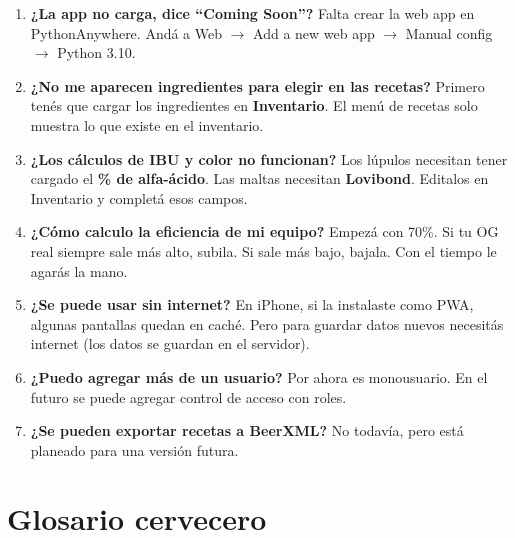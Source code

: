 \documentclass[11pt,a4paper]{report}
\begin{document}
\begin{enumerate}[leftmargin=*, itemsep=8pt]

\item \textbf{¿La app no carga, dice ``Coming Soon''?}
Falta crear la web app en PythonAnywhere. Andá a Web $\to$ Add a new web app $\to$ Manual config $\to$ Python 3.10.

\item \textbf{¿No me aparecen ingredientes para elegir en las recetas?}
Primero tenés que cargar los ingredientes en \textbf{Inventario}. El menú de recetas solo muestra lo que existe en el inventario.

\item \textbf{¿Los cálculos de IBU y color no funcionan?}
Los lúpulos necesitan tener cargado el \textbf{\% de alfa-ácido}. Las maltas necesitan \textbf{Lovibond}. Editalos en Inventario y completá esos campos.

\item \textbf{¿Cómo calculo la eficiencia de mi equipo?}
Empezá con 70\%. Si tu OG real siempre sale más alto, subila. Si sale más bajo, bajala. Con el tiempo le agarás la mano.

\item \textbf{¿Se puede usar sin internet?}
En iPhone, si la instalaste como PWA, algunas pantallas quedan en caché. Pero para guardar datos nuevos necesitás internet (los datos se guardan en el servidor).

\item \textbf{¿Puedo agregar más de un usuario?}
Por ahora es monousuario. En el futuro se puede agregar control de acceso con roles.

\item \textbf{¿Se pueden exportar recetas a BeerXML?}
No todavía, pero está planeado para una versión futura.

\end{enumerate}

\chapter{Glosario cervecero}
\end{document}
